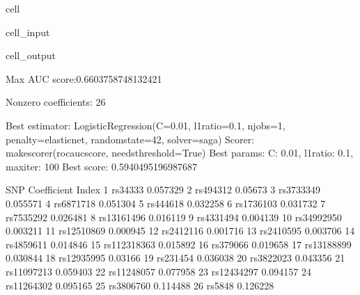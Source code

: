 \documentclass[letterpaper,10pt,english]{jupyterBook}
\begin{document}
\begin{sphinxuseclass}{cell}
\begin{sphinxVerbatimInput}
\begin{sphinxuseclass}{cell_input}
\end{sphinxuseclass}\end{sphinxVerbatimInput}
\begin{sphinxVerbatimOutput}

\begin{sphinxuseclass}{cell_output}
\begin{sphinxVerbatim}[commandchars=\\\{\}]
Max AUC score:0.6603758748132421

Non\PYGZhy{}zero coefficients: 26

Best estimator: LogisticRegression(C=0.01, l1\PYGZus{}ratio=0.1, n\PYGZus{}jobs=\PYGZhy{}1, penalty=\PYGZsq{}elasticnet\PYGZsq{},
                   random\PYGZus{}state=42, solver=\PYGZsq{}saga\PYGZsq{})
Scorer: make\PYGZus{}scorer(roc\PYGZus{}auc\PYGZus{}score, needs\PYGZus{}threshold=True)
Best params: \PYGZob{}\PYGZsq{}C\PYGZsq{}: 0.01, \PYGZsq{}l1\PYGZus{}ratio\PYGZsq{}: 0.1, \PYGZsq{}max\PYGZus{}iter\PYGZsq{}: 100\PYGZcb{}
Best score: 0.5940495196987687
\end{sphinxVerbatim}

\begin{sphinxVerbatim}[commandchars=\\\{\}]
               SNP Coefficient
Index                         
1          rs34333   \PYGZhy{}0.057329
2         rs494312    \PYGZhy{}0.05673
3        rs3733349   \PYGZhy{}0.055571
4        rs6871718   \PYGZhy{}0.051304
5         rs444618   \PYGZhy{}0.032258
6        rs1736103   \PYGZhy{}0.031732
7        rs7535292   \PYGZhy{}0.026481
8       rs13161496   \PYGZhy{}0.016119
9        rs4331494   \PYGZhy{}0.004139
10      rs34992950   \PYGZhy{}0.003211
11      rs12510869   \PYGZhy{}0.000945
12       rs2412116    0.001716
13       rs2410595    0.003706
14       rs4859611    0.014846
15     rs112318363    0.015892
16        rs379066    0.019658
17      rs13188899    0.030844
18      rs12935995     0.03166
19        rs231454    0.036038
20       rs3822023    0.043356
21      rs11097213    0.059403
22      rs11248057    0.077958
23      rs12434297    0.094157
24      rs11264302    0.095165
25       rs3806760    0.114488
26          rs5848    0.126228
\end{sphinxVerbatim}

\end{sphinxuseclass}\end{sphinxVerbatimOutput}

\end{sphinxuseclass}
\end{document}
